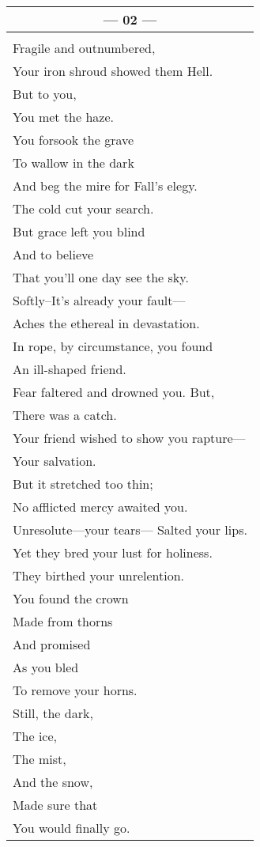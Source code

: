 \documentclass{article}
\begin{document}
\begin{center}
\begin{tabular}{l}
\multicolumn{1}{c}{\textbf{--- 02 ---}} \\ \hline
\\
Fragile and outnumbered, \\
Your iron shroud showed them Hell. \\
But to you, \\
You met the haze. \\
You forsook the grave \\
To wallow in the dark \\
And beg the mire for Fall's elegy. \\
The cold cut your search. \\
But grace left you blind \\
And to believe \\
That you'll one day see the sky. \\
Softly--It's already your fault--- \\
Aches the ethereal in devastation. \\
In rope, by circumstance, you found \\
An ill-shaped friend. \\
Fear faltered and drowned you. But, \\
There was a catch. \\
Your friend wished to show you rapture--- \\
Your salvation. \\
But it stretched too thin; \\
No afflicted mercy awaited you. \\
Unresolute---your tears---
Salted your lips. \\
Yet they bred your lust for holiness. \\
They birthed your unrelention. \\
You found the crown \\
Made from thorns \\
And promised \\
As you bled \\
To remove your horns. \\
Still, the dark, \\
The ice, \\
The mist, \\
And the snow, \\
Made sure that \\
You would finally go. \\

\end{tabular}
\end{center}
\end{document}
